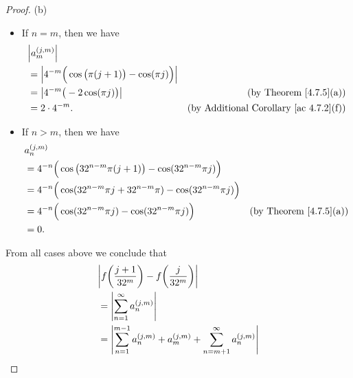 \begin{proof}{(b)}
\begin{itemize}
        \item If \(n = m\), then we have
              \begin{align*}
                   & \abs{a_m^{(j, m)}}                                                                                                    \\
                   & = \abs{4^{-m} \Big(\cos\big(\pi (j + 1)\big) - \cos(\pi j)\Big)}                                                      \\
                   & = \abs{4^{-m} \big(-2 \cos(\pi j)\big)}                          & \text{(by Theorem \ref{4.7.5}(a))}                 \\
                   & = 2 \cdot 4^{-m}.                                                & \text{(by Additional Corollary \ref{ac 4.7.2}(f))}
              \end{align*}
        \item If \(n > m\), then we have
              \begin{align*}
                   & a_n^{(j, m)}                                                                                                             \\
                   & = 4^{-n} \Big(\cos\big(32^{n - m} \pi (j + 1)\big) - \cos(32^{n - m} \pi j)\Big)                                         \\
                   & = 4^{-n} \Big(\cos(32^{n - m} \pi j + 32^{n - m} \pi) - \cos(32^{n - m} \pi j)\Big)                                      \\
                   & = 4^{-n} \Big(\cos(32^{n - m} \pi j) - \cos(32^{n - m} \pi j)\Big)                  & \text{(by Theorem \ref{4.7.5}(a))} \\
                   & = 0.
              \end{align*}
    \end{itemize}
    From all cases above we conclude that
    \begin{align*}
         & \abs{f\bigg(\frac{j + 1}{32^m}\bigg) - f\bigg(\frac{j}{32^m}\bigg)}                                                                    \\
         & = \abs{\sum_{n = 1}^\infty a_n^{(j, m)}}                                                                                               \\
         & = \abs{\sum_{n = 1}^{m - 1} a_n^{(j, m)} + a_m^{(j, m)} + \sum_{n = m + 1}^\infty a_n^{(j, m)}}                                        \\

\end{align*}
\end{proof}
